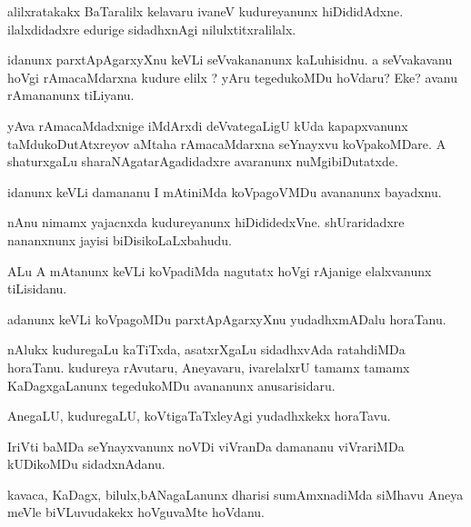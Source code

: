 \documentclass{article}
\begin{document}
\begin{mn}%
alilxratakakx BaTaralilx kelavaru ivaneV kudureyanunx hiDididAdxne. ilalxdidadxre edurige 
sidadhxnAgi nilulxtitxralilalx.
\end{mn}

\begin{mn}%
idanunx parxtApAgarxyXnu keVLi seVvakananunx kaLuhisidnu. a seVvakavanu  hoVgi 
rAmacaMdarxna kudure elilx ? yAru tegedukoMDu hoVdaru? Eke? avanu rAmananunx tiLiyanu.
\end{mn}

\begin{mn}%
yAva rAmacaMdadxnige iMdArxdi deVvategaLigU kUda kapapxvanunx taMdukoDutAtxreyov aMtaha 
rAmacaMdarxna seYnayxvu koVpakoMDare. A shaturxgaLu sharaNAgatarAgadidadxre avaranunx 
nuMgibiDutatxde.
\end{mn}

\begin{mn}%
idanunx keVLi damananu I mAtiniMda koVpagoVMDu avananunx bayadxnu.
\end{mn}

\begin{mn}%
nAnu nimamx yajacnxda kudureyanunx hiDididedxVne. shUraridadxre nananxnunx jayisi 
biDisikoLaLxbahudu.
\end{mn}

\begin{mn}%
ALu A mAtanunx keVLi koVpadiMda nagutatx hoVgi rAjanige elalxvanunx tiLisidanu.
\end{mn}

\begin{mn}%
adanunx keVLi koVpagoMDu parxtApAgarxyXnu yudadhxmADalu horaTanu.
\end{mn}

\begin{mn}%
nAlukx kuduregaLu kaTiTxda, asatxrXgaLu sidadhxvAda ratahdiMDa horaTanu. kudureya 
rAvutaru, Aneyavaru, ivarelalxrU tamamx tamamx KaDagxgaLanunx tegedukoMDu avananunx 
anusarisidaru.
\end{mn}

\begin{mn}%
AnegaLU, kuduregaLU, koVtigaTaTxleyAgi yudadhxkekx horaTavu.
\end{mn}

\begin{mn}%
IriVti baMDa seYnayxvanunx noVDi viVranDa damananu viVrariMDa kUDikoMDu sidadxnAdanu.
\end{mn}

\begin{mn}%
kavaca, KaDagx, bilulx,bANagaLanunx dharisi sumAmxnadiMda siMhavu Aneya meVle 
biVLuvudakekx hoVguvaMte hoVdanu.
\end{mn}
\end{document}
